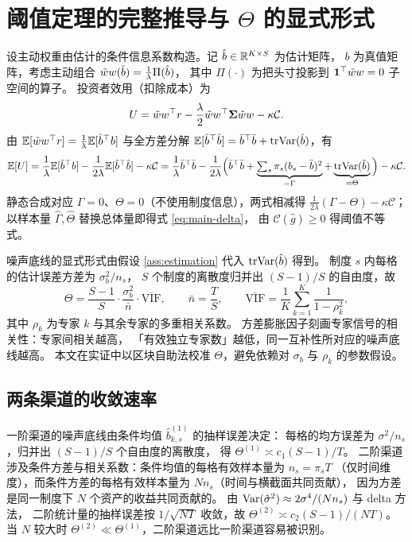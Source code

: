 \appendix

\section{阈值定理的完整推导与 $\Theta$ 的显式形式}
\label{app:proof}

设主动权重由估计的条件信息系数构造。记 $\hat b\in\mathbb{R}^{K\times S}$ 为估计矩阵，
$b$ 为真值矩阵，考虑主动组合 $\tilde{w} w(\hat b)=\frac1\lambda\Pi(\hat b)$，
其中 $\Pi(\cdot)$ 为把头寸投影到 $\mathbf{1}^\top\tilde{w} w=0$ 子空间的算子。
投资者效用（扣除成本）为
\begin{equation}
U=\tilde{w} w^\top r-\frac{\lambda}{2}\tilde{w} w^\top\boldsymbol{\Sigma}\tilde{w} w-\kappa\mathcal{C}.
\end{equation}
由 $\mathbb{E}[\tilde{w} w^\top r]=\frac1\lambda\mathbb{E}[\hat b^\top b]$ 与全方差分解
$\mathbb{E}[\hat b^\top\hat b]=\bar b^\top\bar b+\mathrm{tr}\mathrm{Var}(\hat b)$，有
\begin{equation}
\mathbb{E}[U]=\frac1\lambda\mathbb{E}[\hat b^\top b]-\frac{1}{2\lambda}\mathbb{E}[\hat b^\top\hat b]-\kappa\mathcal{C}
=\frac1\lambda\bar b^\top\bar b
-\frac{1}{2\lambda}\Big(\bar b^\top\bar b+\underbrace{\textstyle\sum_s\pi_s(b_s-\bar b)^2}_{=\Gamma}
+\underbrace{\mathrm{tr}\mathrm{Var}(\hat b)}_{=\Theta}\Big)-\kappa\mathcal{C}.
\end{equation}
静态合成对应 $\Gamma=0$、$\Theta=0$（不使用制度信息），两式相减得
$\frac{1}{2\lambda}(\Gamma-\Theta)-\kappa\mathcal{C}$；
以样本量 $\hat\Gamma,\hat\Theta$ 替换总体量即得式 \eqref{eq:main-delta}，
由 $\mathcal{C}(\hat g)\ge0$ 得阈值不等式。

噪声底线的显式形式由假设 \ref{ass:estimation} 代入 $\mathrm{tr}\mathrm{Var}(\hat b)$ 得到。
制度 $s$ 内每格的估计误差方差为 $\sigma_b^2/n_s$，
$S$ 个制度的离散度归并出 $(S-1)/S$ 的自由度，故
\begin{equation}
\Theta=\frac{S-1}{S}\cdot\frac{\sigma_b^2}{\bar n}\cdot\overline{\mathrm{VIF}},
\qquad \bar n=\frac{T}{S},
\qquad
\overline{\mathrm{VIF}}=\frac1K\sum_{k=1}^K\frac{1}{1-\rho_k^2},
\end{equation}
其中 $\rho_k$ 为专家 $k$ 与其余专家的多重相关系数。
方差膨胀因子刻画专家信号的相关性：专家间相关越高，
「有效独立专家数」越低，同一互补性所对应的噪声底线越高。
本文在实证中以区块自助法校准 $\Theta$，避免依赖对 $\sigma_b$ 与 $\rho_k$ 的参数假设。

\subsection*{两条渠道的收敛速率}

一阶渠道的噪声底线由条件均值 $\hat b^{(1)}_{k,s}$ 的抽样误差决定：
每格的均方误差为 $\sigma^2/n_s$，归并出 $(S-1)/S$ 个自由度的离散度，
得 $\Theta^{(1)}\asymp c_1(S-1)/T$。
二阶渠道涉及条件方差与相关系数：条件均值的每格有效样本量为 $n_s=\pi_sT$
（仅时间维度），而条件方差的每格有效样本量为 $Nn_s$（时间与横截面共同贡献），
因为方差是同一制度下 $N$ 个资产的收益共同贡献的。
由 $\mathrm{Var}(\hat\sigma^2)\approx2\sigma^4/(Nn_s)$ 与 delta 方法，
二阶统计量的抽样误差按 $1/\sqrt{NT}$ 收敛，故 $\Theta^{(2)}\asymp c_2(S-1)/(NT)$。
当 $N$ 较大时 $\Theta^{(2)}\ll\Theta^{(1)}$，二阶渠道远比一阶渠道容易被识别。

